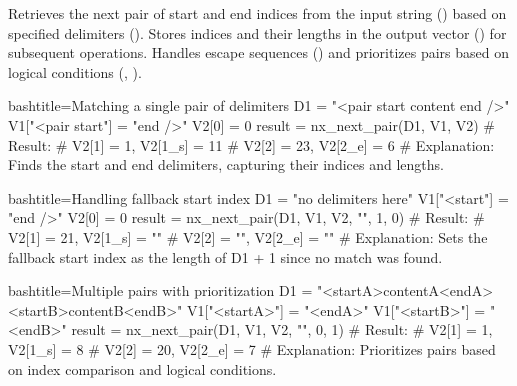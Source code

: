 \begin{NexMainBox}
	\begin{NexMainBox}
		Retrieves the next pair of start and end indices from the input string () based on specified delimiters (). Stores indices and their lengths in the output vector () for subsequent operations. Handles escape sequences () and prioritizes pairs based on logical conditions (, ).
	\end{NexMainBox}
	\begin{NexMainBox}
		\begin{NexListDark}
		\end{NexListDark}
	\end{NexMainBox}
\end{NexMainBox}

\begin{NexCodeBox}{bash}{title={Matching a single pair of delimiters}}
	D1 = "<pair start content end />"
	V1["<pair start"] = "end />"
	V2[0] = 0
	result = nx_next_pair(D1, V1, V2)
	# Result:
	# V2[1] = 1, V2[1_s] = 11
	# V2[2] = 23, V2[2_e] = 6
	# Explanation: Finds the start and end delimiters, capturing their indices and lengths.
\end{NexCodeBox}

\begin{NexCodeBox}{bash}{title={Handling fallback start index}}
	D1 = "no delimiters here"
	V1["<start"] = "end />"
	V2[0] = 0
	result = nx_next_pair(D1, V1, V2, "", 1, 0)
	# Result:
	# V2[1] = 21, V2[1_s] = ""
	# V2[2] = "", V2[2_e] = ""
	# Explanation: Sets the fallback start index as the length of D1 + 1 since no match was found.
\end{NexCodeBox}

\begin{NexCodeBox}{bash}{title={Multiple pairs with prioritization}}
	D1 = "<startA>contentA<endA><startB>contentB<endB>"
	V1["<startA>"] = "<endA>"
	V1["<startB>"] = "<endB>"
	result = nx_next_pair(D1, V1, V2, "", 0, 1)
	# Result:
	# V2[1] = 1, V2[1_s] = 8
	# V2[2] = 20, V2[2_e] = 7
	# Explanation: Prioritizes pairs based on index comparison and logical conditions.
\end{NexCodeBox}









